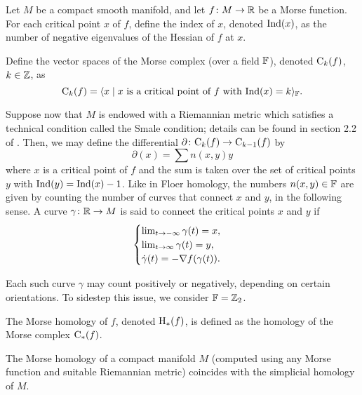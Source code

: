 \begin{definition}
Let $M$ be a compact smooth manifold, and let $f \colon M \to \mathbb{R}$ be a Morse function. For each critical point $x$ of $f$, define the index of $x$, denoted $\operatorname{Ind}(x)$, as the number of negative eigenvalues of the Hessian of $f$ at $x$.

Define the vector spaces of the Morse complex (over a field $\mathbb{F}$), denoted $\mathrm{C}_k(f)$, $k \in \mathbb{Z}$, as
\begin{equation}
\mathrm{C}_k(f) = \langle x \mid \text{$x$ is a critical point of $f$ with $\operatorname{Ind}(x) = k$}\rangle_{\mathbb{F}}.
\end{equation}

Suppose now that $M$ is endowed with a Riemannian metric which satisfies a technical condition called the Smale condition; details can be found in section 2.2 of \cite{audin}. Then, we may define the differential $\partial \colon \mathrm{C}_k(f) \to \mathrm{C}_{k-1}(f)$ by
\begin{equation}
\partial(x) = \sum n(x,y) y
\end{equation}
where $x$ is a critical point of $f$ and the sum is taken over the set of critical points $y$ with $\operatorname{Ind}(y) = \operatorname{Ind}(x) - 1$. Like in Floer homology, the numbers $n(x,y) \in \mathbb{F}$ are given by counting the number of curves that connect $x$ and $y$, in the following sense. A curve $\gamma \colon \mathbb{R} \to M$ is said to connect the critical points $x$ and $y$ if
\begin{equation}\label{eq:curveconnect}
\begin{cases}
\lim_{t \to -\infty} \gamma(t) = x,\\
\lim_{t \to \infty} \gamma(t) = y,\\
\dot \gamma(t) = - \nabla f(\gamma(t)).
\end{cases}
\end{equation}

Each such curve $\gamma$ may count positively or negatively, depending on certain orientations. To sidestep this issue, we consider $\mathbb{F} = \mathbb{Z}_2$.

The Morse homology of $f$, denoted $\mathrm{H}_*(f)$, is defined as the homology of the Morse complex $\mathrm{C}_*(f)$.
\end{definition}

\begin{theorem}
The Morse homology of a compact manifold $M$ (computed using any Morse function and suitable Riemannian metric) coincides with the simplicial homology of $M$.
\end{theorem}

